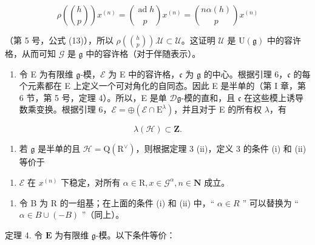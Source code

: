 \[
\rho \left(\binom{h}{p}\right) x ^ {(n)} = \binom{\operatorname{ad} h}{p} x ^ {(n)} = \binom{n \alpha (h)}{p} x ^ {(n)}
\]

（第 5 号，公式 (13)），所以 \(\rho\left(\binom{h}{p}\right). \mathcal{U} \subset \mathcal{U}\)。这证明 \(\mathcal{U}\) 是 \(\mathrm{U}(\mathfrak{g})\) 中的容许格，从而可知 \(\mathcal{G}\) 是 \(\mathfrak{g}\) 中的容许格（对于伴随表示）。

\begin{enumerate}
\def\labelenumi{\arabic{enumi})}
\setcounter{enumi}{2}
\tightlist
\item
  令 E 为有限维 \(\mathfrak{g}\)-模，\(\mathcal{E}\) 为 E 中的容许格，\(\mathfrak{c}\) 为 \(\mathfrak{g}\) 的中心。根据引理 6，\(\mathfrak{c}\) 的每个元素都在 E 上定义一个可对角化的自同态。因此 E 是半单的（第 I 章，第 6 节，第 5 号，定理 4）。所以，E 是单 \(\mathcal{D}\mathfrak{g}\)-模的直和，且 \(\mathfrak{c}\) 在这些模上诱导数乘变换。根据引理 6，\(\mathcal{E}=\oplus(\mathcal{E}\cap\mathrm{E}^{\lambda})\)，并且对于 E 的所有权 \(\lambda\)，有
\end{enumerate}

\[
\lambda (\mathcal {H}) \subset \mathbf {Z}.
\]

\begin{enumerate}
\def\labelenumi{\arabic{enumi})}
\setcounter{enumi}{3}
\tightlist
\item
  若 \(\mathfrak{g}\) 是半单的且 \(\mathcal{H} = \mathrm{Q}(\mathrm{R}^{\vee})\)，则根据定理 3 (ii)，定义 3 的条件 (i) 和 (ii) 等价于
\end{enumerate}

\begin{enumerate}
\def\labelenumi{(\roman{enumi})}
\setcounter{enumi}{2}
\tightlist
\item
  \(\mathcal{E}\) 在 \(x^{(n)}\) 下稳定，对所有 \(\alpha \in \mathrm{R}, x \in \mathcal{G}^{\alpha}, n \in \mathbf{N}\) 成立。
\end{enumerate}

\begin{enumerate}
\def\labelenumi{\arabic{enumi})}
\setcounter{enumi}{4}
\tightlist
\item
  令 B 为 R 的一组基；在上面的条件 (i) 和 (ii) 中，`` \(\alpha \in R\) '' 可以替换为 `` \(\alpha \in B \cup (-B)\) ''（同上）。
\end{enumerate}

定理 4. 令 \(\mathbf{E}\) 为有限维 \(\mathfrak{g}\)-模。以下条件等价：

